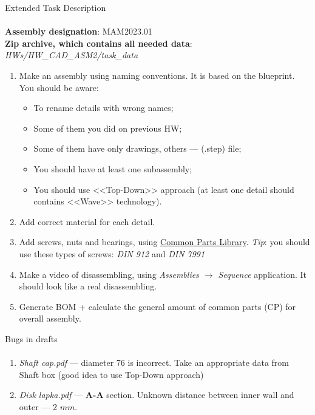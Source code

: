 \documentclass[aspectratio=169]{beamer}
\begin{document}
\begin{frame}[t]{Extended Task Description}
\framesubtitle{}
\vspace{-0.4cm}
\footnotesize
    \textbf{Assembly designation}: MAM2023.01 \\ 
    \textbf{Zip archive, which contains all needed data}: \textit{HWs/HW\_CAD\_ASM2/task\_data}
    \vspace{-0.25cm}
    \begin{enumerate}
        \item Make an assembly using naming conventions. It is based on the blueprint. You should be aware:
        \begin{itemize}
            \footnotesize
            \item To rename details with wrong names;
            \item Some of them you did on previous HW;
            \item Some of them have only drawings, others --- (.step) file;
            \item You should have at least one subassembly;
            \item You should use <<Top-Down>> approach (at least one detail should contains <<Wave>> technology).
        \end{itemize}
        \item Add correct material for each detail.
        \item Add screws, nuts and bearings, using \href{https://www.mcmaster.com/}{Common Parts Library}. \textit{Tip}: you should use these types of screws: \textit{DIN 912} and \textit{DIN 7991}
        \item Make a video of disassembling, using \textit{Assemblies $\rightarrow$ Sequence} application. It should look like a real disassembling.
        \item Generate BOM + calculate the general amount of common parts (CP) for overall assembly.
    \end{enumerate}
\end{frame}

\begin{frame}[t]{Bugs in drafts}
\framesubtitle{}
    \begin{enumerate}
        \item \textit{Shaft cap.pdf} --- diameter 76 is incorrect. Take an appropriate data from Shaft box (good idea to use Top-Down approach)
        \item \textit{Disk lapka.pdf} --- \textbf{A-A} section. Unknown distance between inner wall and outer --- 2 $mm$.
    \end{enumerate}
\end{frame}
\end{document}
